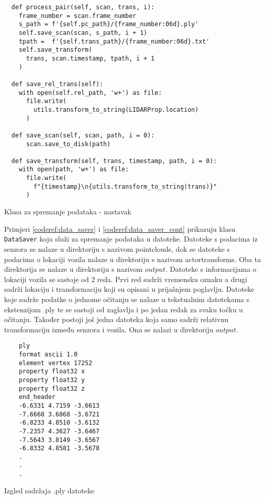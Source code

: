 \begin{listing}[h!]
  \begin{verbatim}
  def process_pair(self, scan, trans, i):
    frame_number = scan.frame_number
    s_path = f'{self.pc_path}/{frame_number:06d}.ply'
    self.save_scan(scan, s_path, i + 1)
    tpath =  f'{self.trans_path}/{frame_number:06d}.txt'
    self.save_transform(
      trans, scan.timestamp, tpath, i + 1
    )

  def save_rel_trans(self):
    with open(self.rel_path, 'w+') as file:
      file.write(
        utils.transform_to_string(LIDARProp.location)
      )

  def save_scan(self, scan, path, i = 0):
      scan.save_to_disk(path)

  def save_transform(self, trans, timestamp, path, i = 0):
    with open(path, 'w+') as file:
      file.write(
        f"{timestamp}\n{utils.transform_to_string(trans)}"
      )
  \end{verbatim}
  \caption{Klasa za spremanje podataka - nastavak}
  \label{coderef:data_saver_cont}
\end{listing}

Primjeri \ref{coderef:data_saver} i \ref{coderef:data_saver_cont} prikazuju klasu \texttt{DataSaver} koja služi za spremanje podataka u datoteke. Datoteke s podacima iz senzora se nalaze u direktoriju s nazivom pointclouds, dok se datoteke s podacima o lokaciji vozila nalaze u direktoriju s nazivom actortransforms. Oba ta direktorija se nalaze u direktoriju s nazivom $output$. Datoteke s informacijama o lokaciji vozila se sastoje od 2 reda. Prvi red sadrži vremensku oznaku a drugi sadrži lokaciju i transformaciju koji su opisani u prijašnjem poglavlju. Datoteke koje sadrže podatke o jednome očitanju se nalaze u tekstualnim datotekama s ekstenzijom .ply te se sastoji od zaglavlja i po jedan redak za svaku točku u očitanju. Također postoji još jedna datoteka koja samo sadrži relativnu transformaciju između senzora i vozila. Ona se nalazi u direktoriju $output$.

\begin{listing}[h!]
  \begin{verbatim}
    ply
    format ascii 1.0
    element vertex 17252
    property float32 x
    property float32 y
    property float32 z
    end_header
    -6.6331 4.7159 -3.6613
    -7.6668 3.6868 -3.6721
    -6.8233 4.8510 -3.6132
    -7.2357 4.3627 -3.6467
    -7.5643 3.8149 -3.6567
    -6.8332 4.8581 -3.5678
    .
    .
    .
  \end{verbatim}
  \caption{Izgled sadržaja .ply datoteke}
  \label{files:ply_format}
\end{listing}